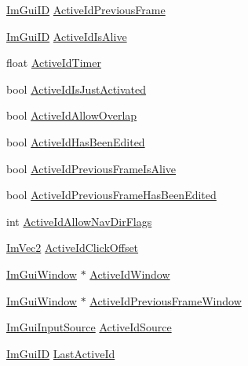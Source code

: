 \begin{DoxyCompactItemize}
\item 
\mbox{\hyperlink{imgui_8h_a1785c9b6f4e16406764a85f32582236f}{Im\+Gui\+ID}} \mbox{\hyperlink{struct_im_gui_context_af58aa479f6c97819694f1709b62c70d8}{Active\+Id\+Previous\+Frame}}
\item 
\mbox{\hyperlink{imgui_8h_a1785c9b6f4e16406764a85f32582236f}{Im\+Gui\+ID}} \mbox{\hyperlink{struct_im_gui_context_a91563e660064da31449958c97f70ceb0}{Active\+Id\+Is\+Alive}}
\item 
float \mbox{\hyperlink{struct_im_gui_context_a9deb2b22abfb5a4fd306371b19e2b9c4}{Active\+Id\+Timer}}
\item 
bool \mbox{\hyperlink{struct_im_gui_context_aa539096bf2b0ab28e0dbf73d595c64d8}{Active\+Id\+Is\+Just\+Activated}}
\item 
bool \mbox{\hyperlink{struct_im_gui_context_ab3234556023eabcfed157b79ba4c5869}{Active\+Id\+Allow\+Overlap}}
\item 
bool \mbox{\hyperlink{struct_im_gui_context_a554e7070ccdae5d5c9eb69b9957f1e85}{Active\+Id\+Has\+Been\+Edited}}
\item 
bool \mbox{\hyperlink{struct_im_gui_context_aaaf25ebc4878ed8b203106accfc6b896}{Active\+Id\+Previous\+Frame\+Is\+Alive}}
\item 
bool \mbox{\hyperlink{struct_im_gui_context_a0cd140aeedfcd5625c440d450468bb7c}{Active\+Id\+Previous\+Frame\+Has\+Been\+Edited}}
\item 
int \mbox{\hyperlink{struct_im_gui_context_a27b17ce018cfcd821f29636eba5407b6}{Active\+Id\+Allow\+Nav\+Dir\+Flags}}
\item 
\mbox{\hyperlink{struct_im_vec2}{Im\+Vec2}} \mbox{\hyperlink{struct_im_gui_context_a28afb4e9b4ac155825f4b4c94cdc516c}{Active\+Id\+Click\+Offset}}
\item 
\mbox{\hyperlink{struct_im_gui_window}{Im\+Gui\+Window}} $\ast$ \mbox{\hyperlink{struct_im_gui_context_a95a35b5d82d3fdea28b71580dc6a9618}{Active\+Id\+Window}}
\item 
\mbox{\hyperlink{struct_im_gui_window}{Im\+Gui\+Window}} $\ast$ \mbox{\hyperlink{struct_im_gui_context_ac164cf439dcb5d37f0e572f5e27eea25}{Active\+Id\+Previous\+Frame\+Window}}
\item 
\mbox{\hyperlink{imgui__internal_8h_a8ee603a145a3a4f4ab5c93c8c8333b78}{Im\+Gui\+Input\+Source}} \mbox{\hyperlink{struct_im_gui_context_a315c9fa88996fa84c260c93322941bf1}{Active\+Id\+Source}}
\item 
\mbox{\hyperlink{imgui_8h_a1785c9b6f4e16406764a85f32582236f}{Im\+Gui\+ID}} \mbox{\hyperlink{struct_im_gui_context_a8609dbb667eced2b9f1eb1f0c0aff838}{Last\+Active\+Id}}

\end{DoxyCompactItemize}
